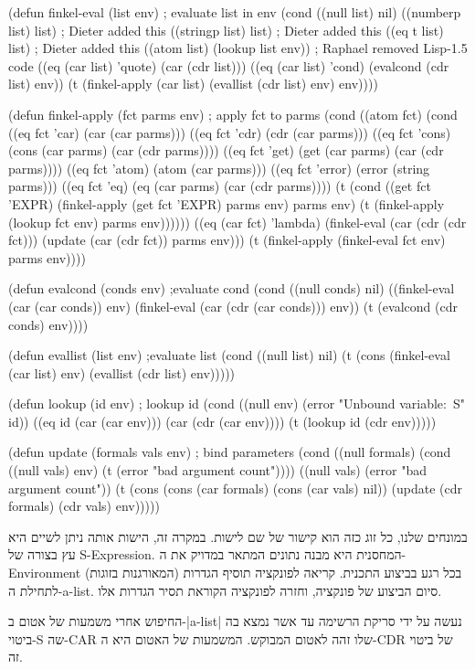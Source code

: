 \begin{LISP}
(defun finkel-eval (list env) ; evaluate list in env
(cond
((null list) nil)
((numberp list) list) ; Dieter added this
((stringp list) list) ; Dieter added this
((eq t list) list) ; Dieter added this
((atom list) (lookup list env)) ; Raphael removed Lisp-1.5 code
((eq (car list) 'quote) (car (cdr list)))
((eq (car list) 'cond) (evalcond (cdr list) env))
(t (finkel-apply (car list) (evallist (cdr list) env) env))))

(defun finkel-apply (fct parms env) ; apply fct to parms
(cond
((atom fct) (cond
((eq fct 'car) (car (car parms)))
((eq fct 'cdr) (cdr (car parms)))
((eq fct 'cons) (cons (car parms) (car (cdr parms))))
((eq fct 'get) (get (car parms) (car (cdr parms))))
((eq fct 'atom) (atom (car parms)))
((eq fct 'error) (error (string parms)))
((eq fct 'eq) (eq (car parms) (car (cdr parms))))
(t (cond
((get fct 'EXPR)
(finkel-apply (get fct 'EXPR) parms env) parms env)
(t (finkel-apply (lookup fct env) parms env))))))
((eq (car fct) 'lambda)
(finkel-eval (car (cdr (cdr fct)))
(update (car (cdr fct)) parms env)))
(t (finkel-apply (finkel-eval fct env) parms env))))

(defun evalcond (conds env) ;evaluate cond
(cond
((null conds) nil)
((finkel-eval (car (car conds)) env)
(finkel-eval (car (cdr (car conds))) env))
(t (evalcond (cdr conds) env))))

(defun evallist (list env) ;evaluate list
(cond
((null list) nil)
(t (cons (finkel-eval (car list) env)
(evallist (cdr list) env)))))

(defun lookup (id env) ; lookup id
(cond
((null env) (error "Unbound variable:~S" id))
((eq id (car (car env))) (car (cdr (car env))))
(t (lookup id (cdr env)))))

(defun update (formals vals env) ; bind parameters
(cond
((null formals)
(cond ((null vals) env)
(t (error "bad argument count"))))
((null vals) (error "bad argument count"))
(t (cons (cons (car formals)
(cons (car vals) nil))
(update (cdr formals) (cdr vals) env)))))
\end{LISP}במונחים שלנו, כל זוג כזה הוא קישור של שם לישות. במקרה זה, הישות אותה ניתן לשיים
היא עץ בצורה של S-Expression. המחסנית היא מבנה
נתונים המתאר במדויק את ה-Environment בכל רגע בביצוע התכנית. קריאה לפונקציה
תוסיף הגדרות (המאורגנות בזוגות) לתחילת ה-a-list. סיום הביצוע של פונקציה, וחזרה
לפונקציה הקוראת תסיר הגדרות אלו.

החיפוש אחרי משמעות של
אטום ב-\E|a-list| נעשה על ידי סריקת הרשימה עד אשר נמצא בה ביטוי-S שה-CAR שלו
זהה לאטום המבוקש. המשמעות של האטום היא ה-CDR של ביטוי זה.


